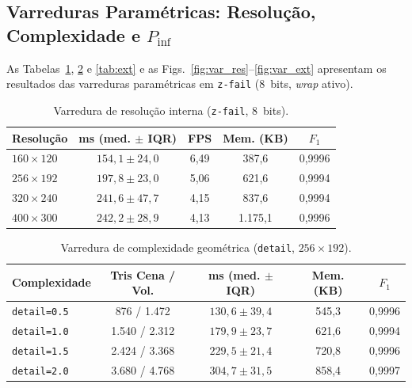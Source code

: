 \documentclass[conference]{IEEEtran}
\begin{document}
\subsection{Varreduras Paramétricas: Resolução, Complexidade e $P_{\text{inf}}$}

As Tabelas~\ref{tab:res}, \ref{tab:det} e \ref{tab:ext} e as Figs.~\ref{fig:var_res}--\ref{fig:var_ext} apresentam os resultados das varreduras paramétricas em \texttt{z-fail} (8~bits, \textit{wrap} ativo).

\begin{table}[t]
\centering
\caption{Varredura de resolução interna (\texttt{z-fail}, 8~bits).}
\label{tab:res}
\begin{tabular}{lcccc}
\toprule
\textbf{Resolução} & \textbf{ms (med. $\pm$ IQR)} & \textbf{FPS} & \textbf{Mem. (KB)} & \textbf{$F_1$} \\
\midrule
$160\times 120$ & $154{,}1 \pm 24{,}0$ & 6,49 & 387,6 & 0,9996 \\
$256\times 192$ & $197{,}8 \pm 23{,}0$ & 5,06 & 621,6 & 0,9994 \\
$320\times 240$ & $241{,}6 \pm 47{,}7$ & 4,15 & 837,6 & 0,9994 \\
$400\times 300$ & $242{,}2 \pm 28{,}9$ & 4,13 & 1.175,1 & 0,9996 \\
\bottomrule
\end{tabular}
\end{table}

\begin{table}[t]
\centering
\caption{Varredura de complexidade geométrica (\texttt{detail}, $256\times 192$).}
\label{tab:det}
\begin{tabular}{lcccc}
\toprule
\textbf{Complexidade} & \textbf{Tris Cena / Vol.} & \textbf{ms (med. $\pm$ IQR)} & \textbf{Mem. (KB)} & \textbf{$F_1$} \\
\midrule
\texttt{detail=0.5} & 876 / 1.472 & $130{,}6 \pm 39{,}4$ & 545,3 & 0,9996 \\
\texttt{detail=1.0} & 1.540 / 2.312 & $179{,}9 \pm 23{,}7$ & 621,6 & 0,9994 \\
\texttt{detail=1.5} & 2.424 / 3.368 & $229{,}5 \pm 21{,}4$ & 720,8 & 0,9996 \\
\texttt{detail=2.0} & 3.680 / 4.768 & $304{,}7 \pm 31{,}5$ & 858,4 & 0,9997 \\
\bottomrule
\end{tabular}
\end{table}
\end{document}
